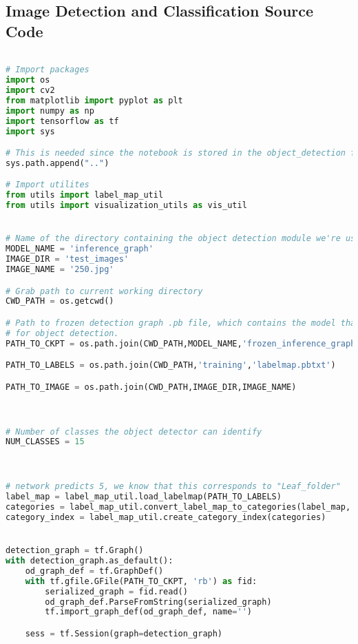 \begin{appendices}

\chapter{Image Detection and Classification Source Code}

\begin{lstlisting}[language=Python, caption=Image Detection and Classification]

# Import packages
import os
import cv2
from matplotlib import pyplot as plt
import numpy as np
import tensorflow as tf
import sys

# This is needed since the notebook is stored in the object_detection folder.
sys.path.append("..")

# Import utilites
from utils import label_map_util
from utils import visualization_utils as vis_util


# Name of the directory containing the object detection module we're using
MODEL_NAME = 'inference_graph'
IMAGE_DIR = 'test_images'
IMAGE_NAME = '250.jpg'

# Grab path to current working directory
CWD_PATH = os.getcwd()

# Path to frozen detection graph .pb file, which contains the model that is used
# for object detection.
PATH_TO_CKPT = os.path.join(CWD_PATH,MODEL_NAME,'frozen_inference_graph.pb')

PATH_TO_LABELS = os.path.join(CWD_PATH,'training','labelmap.pbtxt')

PATH_TO_IMAGE = os.path.join(CWD_PATH,IMAGE_DIR,IMAGE_NAME)



# Number of classes the object detector can identify
NUM_CLASSES = 15



# network predicts 5, we know that this corresponds to "Leaf_folder"
label_map = label_map_util.load_labelmap(PATH_TO_LABELS)
categories = label_map_util.convert_label_map_to_categories(label_map, max_num_classes=NUM_CLASSES, use_display_name=True)
category_index = label_map_util.create_category_index(categories)


detection_graph = tf.Graph()
with detection_graph.as_default():
	od_graph_def = tf.GraphDef()
	with tf.gfile.GFile(PATH_TO_CKPT, 'rb') as fid:
		serialized_graph = fid.read()
		od_graph_def.ParseFromString(serialized_graph)
		tf.import_graph_def(od_graph_def, name='')

	sess = tf.Session(graph=detection_graph)



\end{lstlisting}
\end{appendices}
